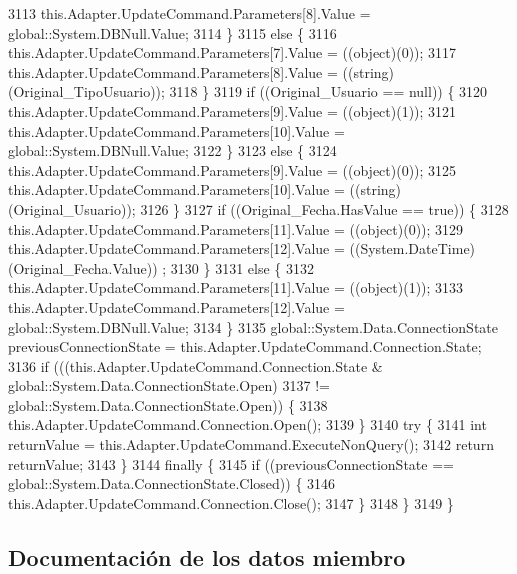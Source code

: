 \begin{DoxyCode}
3113                 this.Adapter.UpdateCommand.Parameters[8].Value = global::System.DBNull.Value;
3114             \}
3115             \textcolor{keywordflow}{else} \{
3116                 this.Adapter.UpdateCommand.Parameters[7].Value = ((object)(0));
3117                 this.Adapter.UpdateCommand.Parameters[8].Value = ((string)(Original\_TipoUsuario));
3118             \}
3119             \textcolor{keywordflow}{if} ((Original\_Usuario == null)) \{
3120                 this.Adapter.UpdateCommand.Parameters[9].Value = ((object)(1));
3121                 this.Adapter.UpdateCommand.Parameters[10].Value = global::System.DBNull.Value;
3122             \}
3123             \textcolor{keywordflow}{else} \{
3124                 this.Adapter.UpdateCommand.Parameters[9].Value = ((object)(0));
3125                 this.Adapter.UpdateCommand.Parameters[10].Value = ((string)(Original\_Usuario));
3126             \}
3127             \textcolor{keywordflow}{if} ((Original\_Fecha.HasValue == \textcolor{keyword}{true})) \{
3128                 this.Adapter.UpdateCommand.Parameters[11].Value = ((object)(0));
3129                 this.Adapter.UpdateCommand.Parameters[12].Value = ((System.DateTime)(Original\_Fecha.Value))
      ;
3130             \}
3131             \textcolor{keywordflow}{else} \{
3132                 this.Adapter.UpdateCommand.Parameters[11].Value = ((object)(1));
3133                 this.Adapter.UpdateCommand.Parameters[12].Value = global::System.DBNull.Value;
3134             \}
3135             global::System.Data.ConnectionState previousConnectionState = 
      this.Adapter.UpdateCommand.Connection.State;
3136             \textcolor{keywordflow}{if} (((this.Adapter.UpdateCommand.Connection.State & global::System.Data.ConnectionState.Open) 
3137                         != global::System.Data.ConnectionState.Open)) \{
3138                 this.Adapter.UpdateCommand.Connection.Open();
3139             \}
3140             \textcolor{keywordflow}{try} \{
3141                 \textcolor{keywordtype}{int} returnValue = this.Adapter.UpdateCommand.ExecuteNonQuery();
3142                 \textcolor{keywordflow}{return} returnValue;
3143             \}
3144             \textcolor{keywordflow}{finally} \{
3145                 \textcolor{keywordflow}{if} ((previousConnectionState == global::System.Data.ConnectionState.Closed)) \{
3146                     this.Adapter.UpdateCommand.Connection.Close();
3147                 \}
3148             \}
3149         \}
\end{DoxyCode}


\subsection{Documentación de los datos miembro}
